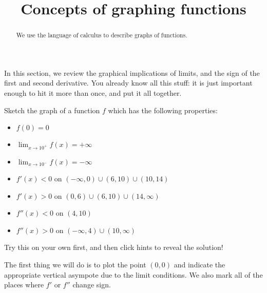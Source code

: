 \documentclass{ximera}
\title[Dig-In:]{Concepts of graphing functions}
\begin{document}
\begin{abstract}
  We use the language of calculus to describe graphs of functions.
\end{abstract}

In this section, we review the graphical implications of limits, and the sign of the first and second derivative.  You already know all this stuff:  it is just important enough to hit it more than once, and put it all together.

\begin{example}
 
	Sketch the graph of a function $f$ which has the following properties:

	\begin{itemize}
	\item $f(0)=0$
	\item $\lim_{x \to 10^+} f(x) = +\infty$
	\item $\lim_{x \to 10^-} f(x) = -\infty$
	\item $f'(x)<0$ on $(-\infty,0) \cup (6,10) \cup (10,14)$
	\item $f'(x)>0$ on $(0,6) \cup (6,10) \cup (14,\infty)$
	\item $f''(x)<0$ on $(4,10)$
	\item $f''(x)>0$ on $(-\infty,4) \cup (10,\infty)$
	\end{itemize}

  \begin{explanation}
	Try this on your own first, and then click hints to reveal the solution!

\begin{hint}
		The first thing we will do is to plot the point $(0,0)$ and indicate the appropriate vertical asympote due to the limit conditions.  We also mark all of the places where $f'$ or $f''$ change sign.


\end{hint}
\end{explanation}
\end{example}
\end{document}

